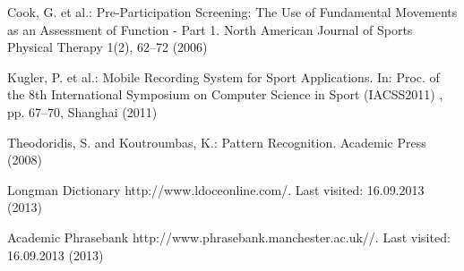 \documentclass[conference]{IEEEtran}
\begin{document}
\begin{thebibliography}{5}

 Cook, G. et al.: {Pre-Participation Screening: The Use of Fundamental Movements as an Assessment of Function - Part 1}. North American Journal of Sports Physical Therapy 1(2), 62--72 (2006) 

Kugler, P. et al.: {Mobile Recording System for Sport Applications}. In: Proc. of the 8th International Symposium on Computer Science in Sport (IACSS2011) , pp. 67--70, Shanghai (2011)  

Theodoridis, S. and Koutroumbas, K.: {Pattern Recognition}. Academic Press (2008)

Longman Dictionary {http://www.ldoceonline.com/}. Last visited: 16.09.2013 (2013)  

Academic Phrasebank {http://www.phrasebank.manchester.ac.uk//}. Last visited: 16.09.2013 (2013)  

\end{thebibliography}




\end{document}
